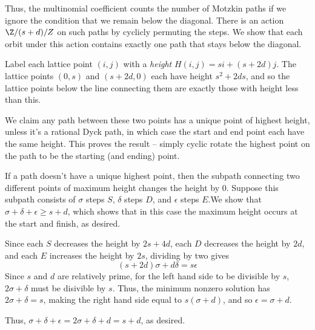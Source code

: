 \documentclass{amsart}
\theoremstyle{definition}
\begin{document}
Thus, the multinomial coefficient counts the number of Motzkin paths if we ignore the condition that we remain below the diagonal.  There is an action $\Z/(s+d)/Z$ on such paths by cyclicly permuting the steps.  We show that each orbit under this action contains exactly one path that stays below the diagonal.

Label each lattice point $(i,j)$ with a \emph{height} $H(i,j)=si+(s+2d)j$.  The lattice points $(0,s)$ and $(s+2d,0)$ each have height $s^2+2ds$, and so the lattice points below the line connecting them are exactly those with height less than this.

We claim any path between these two points has a unique point of highest height, unless it's a rational Dyck path, in which case the start and end point each have the same height.  This proves the result -- simply cyclic rotate the highest point on the path to be the starting (and ending) point.

If a path doesn't have a unique highest point, then the subpath connecting two different points of maximum height changes the height by $0$.  Suppose this subpath consists of $\sigma$ steps $S$, $\delta$ steps $D$, and $\epsilon$ steps $E$.We show that $\sigma+\delta+\epsilon\geq s+d$, which shows that in this case the maximum height occurs at the start and finish, as desired.  

  Since each $S$ decreases the height by $2s+4d$, each $D$ decreases the height by $2d$, and each $E$ increases the height by $2s$, dividing by two gives $$(s+2d)\sigma+d\delta=s\epsilon$$
Since $s$ and $d$ are relatively prime, for the left hand side to be divisible by $s$, $2\sigma+\delta$ must be disivible by $s$.  Thus, the minimum nonzero solution has $2\sigma+\delta=s$, making the right hand side equal to $s(\sigma+d)$, and so $\epsilon=\sigma+d$.

Thus, $\sigma+\delta+\epsilon=2\sigma+\delta+d=s+d$, as desired.
\end{document}
